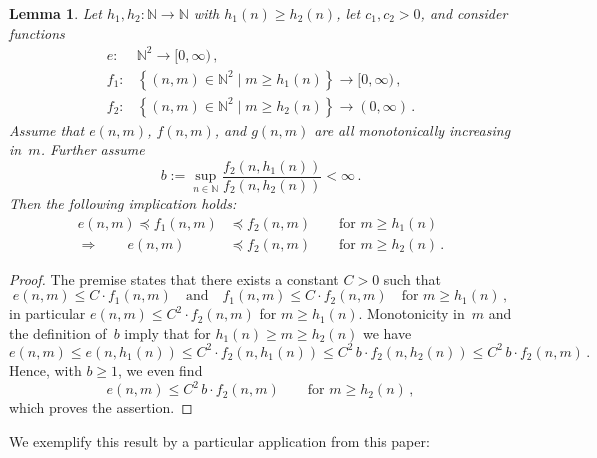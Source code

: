 \documentclass[12pt]{article}
\theoremstyle{plain}
\newtheorem{lemma}[theorem]{Lemma}
\theoremstyle{definition}
\newcommand{\N}{{\mathbb N}}
\begin{document}
\begin{lemma}\label{lem:extendasymp}
    Let $h_1,h_2 \colon \N \to \N$ with $h_1(n) \geq h_2(n)$, let $c_1,c_2 > 0$, and consider functions
    \begin{align*}
        e \colon &\N^2 \to [0,\infty)\,, \\
        f_1 \colon & \left\{(n,m) \in \N^2 \mid m \geq h_1(n) \right\} \to [0,\infty)\,, \\
        f_2 \colon & \left\{(n,m) \in \N^2 \mid m \geq h_2(n) \right\} \to (0,\infty)\,.
    \end{align*}
    Assume that $e(n,m)$, $f(n,m)$, and $g(n,m)$ are all
    monotonically increasing in~$m$.
    Further assume
    \begin{equation*}
        b := \sup_{n \in \N} \frac{f_2(n, h_1(n))}{f_2(n,h_2(n))} < \infty \,.
    \end{equation*}
    Then the following implication holds:
    \begin{align*}
        e(n,m) \preceq f_1(n,m) &\preceq f_2(n,m) \qquad\text{for } m \geq h_1(n) \\
        \Longrightarrow\qquad
        e(n,m) &\preceq f_2(n,m) \qquad\text{for } m \geq h_2(n) \,.
    \end{align*}
\end{lemma}
\begin{proof}
    The premise states that there exists a constant $C > 0$ such that
    \begin{equation*}
        e(n,m) \leq C \cdot f_1(n,m) \quad\text{and}\quad f_1(n,m) \leq C \cdot f_2(n,m) \quad\text{for } m \geq h_1(n) \,,
    \end{equation*}
    in particular $e(n,m) \leq C^2 \cdot f_2(n,m)$ for $m \geq h_1(n)$.
    Monotonicity in~$m$ and the definition of~$b$ imply
    that for $h_1(n) \geq m \geq h_2(n)$ we have
    \begin{equation*}
        e(n,m)
            \leq e(n,h_1(n))
            \leq C^2 \cdot f_2(n,h_1(n))
            \leq C^2 \, b \cdot f_2(n,h_2(n))
            \leq C^2 \, b \cdot f_2(n,m) \,.
    \end{equation*}
    Hence, with $b \geq 1$, we even find
    \begin{equation*}
        e(n,m) \leq C^2 \, b \cdot f_2(n,m)
        \qquad\text{for }m \geq h_2(n) \,,
    \end{equation*}
    which proves the assertion.
\end{proof}


We exemplify this result by a particular application from this paper:
\end{document}
